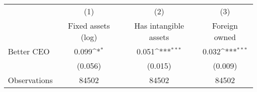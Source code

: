 {
\def\sym#1{\ifmmode^{#1}\else\(^{#1}\)\fi}
\begin{tabular}{l*{3}{c}}
\hline\hline
                    &\multicolumn{1}{c}{(1)}&\multicolumn{1}{c}{(2)}&\multicolumn{1}{c}{(3)}\\
                    &\multicolumn{1}{c}{Fixed assets (log)}&\multicolumn{1}{c}{Has intangible assets}&\multicolumn{1}{c}{Foreign owned}\\
\hline
Better CEO          &       0.099\sym{*}  &       0.051\sym{***}&       0.032\sym{***}\\
                    &     (0.056)         &     (0.015)         &     (0.009)         \\
\hline
Observations        &       84502         &       84502         &       84502         \\
\hline\hline
\end{tabular}
}
